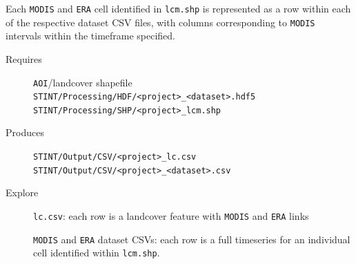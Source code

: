 \documentclass[twoside,a4paper]{refart}
\begin{document}
  Each \texttt{MODIS} and \texttt{ERA} cell identified in \texttt{lcm.shp}
  is represented as a row within 
  each of the respective dataset CSV files, with columns corresponding to \texttt{MODIS} 
  intervals within the timeframe specified.
  
  
  \begin{description}
    \item [Requires]
      \texttt{AOI}/landcover shapefile \\
      \texttt{STINT/Processing/HDF/<project>\_<dataset>.hdf5} \\
      \texttt{STINT/Processing/SHP/<project>\_lcm.shp}
  
  
    \item [Produces]
      \texttt{STINT/Output/CSV/<project>\_lc.csv} \\
      \texttt{STINT/Output/CSV/<project>\_<dataset>.csv}
      
    \item [Explore]
\texttt{lc.csv}: each row is a landcover feature with \texttt{MODIS} and \texttt{ERA} links
        
\texttt{MODIS} and \texttt{ERA} dataset CSVs: each row is a full timeseries for an
          individual cell identified within \texttt{lcm.shp}.
          
  \end{description}


\end{document}
